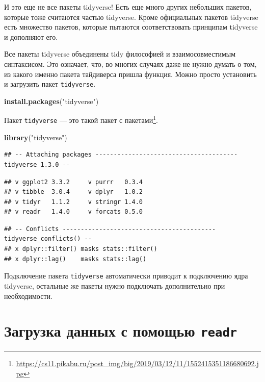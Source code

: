 \documentclass[
]{book}
\newenvironment{Shaded}{\begin{snugshade}}{\end{snugshade}}
\newcommand{\KeywordTok}[1]{\textcolor[rgb]{0.13,0.29,0.53}{\textbf{#1}}}
\newcommand{\NormalTok}[1]{#1}
\newcommand{\StringTok}[1]{\textcolor[rgb]{0.31,0.60,0.02}{#1}}
\renewcommand{\href}[2]{#2\footnote{\url{#1}}}
\begin{document}
И это еще не все пакеты tidyverse! Есть еще много других небольших пакетов, которые тоже считаются частью tidyverse. Кроме официальных пакетов tidyverse есть множество пакетов, которые пытаются соответствовать принципам tidyverse и дополняют его.

Все пакеты tidyverse объединены tidy философией и взаимосовместимым синтаксисом. Это означает, что, во многих случаях даже не нужно думать о том, из какого именно пакета тайдиверса пришла функция. Можно просто установить и загрузить пакет \texttt{tidyverse}.

\begin{Shaded}
\begin{Highlighting}[]
\KeywordTok{install.packages}\NormalTok{(}\StringTok{"tidyverse"}\NormalTok{)}
\end{Highlighting}
\end{Shaded}

Пакет \texttt{tidyverse} --- это такой \href{https://cs11.pikabu.ru/post_img/big/2019/03/12/11/1552415351186680692.jpg}{пакет с пакетами}.

\begin{Shaded}
\begin{Highlighting}[]
\KeywordTok{library}\NormalTok{(}\StringTok{"tidyverse"}\NormalTok{)}
\end{Highlighting}
\end{Shaded}

\begin{verbatim}
## -- Attaching packages --------------------------------------- tidyverse 1.3.0 --
\end{verbatim}

\begin{verbatim}
## v ggplot2 3.3.2     v purrr   0.3.4
## v tibble  3.0.4     v dplyr   1.0.2
## v tidyr   1.1.2     v stringr 1.4.0
## v readr   1.4.0     v forcats 0.5.0
\end{verbatim}

\begin{verbatim}
## -- Conflicts ------------------------------------------ tidyverse_conflicts() --
## x dplyr::filter() masks stats::filter()
## x dplyr::lag()    masks stats::lag()
\end{verbatim}

Подключение пакета \texttt{tidyverse} автоматически приводит к подключению ядра tidyverse, остальные же пакеты нужно подключать дополнительно при необходимости.

\hypertarget{ux437ux430ux433ux440ux443ux437ux43aux430-ux434ux430ux43dux43dux44bux445-ux441-ux43fux43eux43cux43eux449ux44cux44e-readr}{%
\section{\texorpdfstring{Загрузка данных с помощью \texttt{readr}}{Загрузка данных с помощью readr}}\label{ux437ux430ux433ux440ux443ux437ux43aux430-ux434ux430ux43dux43dux44bux445-ux441-ux43fux43eux43cux43eux449ux44cux44e-readr}}
\end{document}
